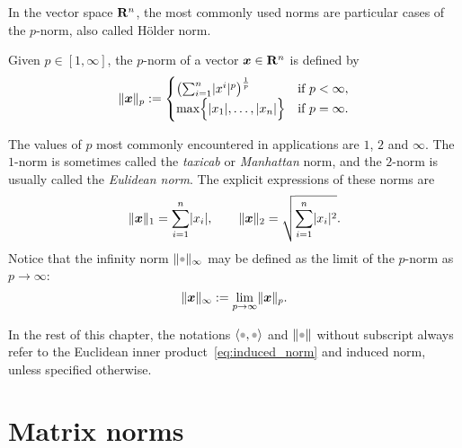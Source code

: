 In the vector space $\mathbf R^n$,
the most commonly used norms are particular cases of the $p$-norm, also called H\"older norm.
\begin{definition}
    \label{definition:pnorm_vector}
    Given $p \in [1, \infty]$,
    the $p$-norm of a vector $\mathbf{\boldsymbol{x}} \in \mathbf R^n$ is defined by
    \[
        \lVert\mathbf{\boldsymbol{x}}\rVert_p :=
        \begin{cases}
            \left( \sum_{i=1}^{n} \lvert x^i\rvert^p \right)^{\frac{1}{p}} & \text{if $p < \infty$}, \\
            \max \Bigl\{ \lvert x_1\rvert, \dotsc, \lvert x_n\rvert \Bigr\} & \text{if $p = \infty$}.
        \end{cases}
    \]
\end{definition}
The values of $p$ most commonly encountered in applications are $1$, $2$ and $\infty$.
The $1$-norm is sometimes called the \emph{taxicab} or \emph{Manhattan} norm,
and the $2$-norm is usually called the \emph{Eulidean norm}.
The explicit expressions of these norms are
\[
    \lVert\mathbf{\boldsymbol{x}}\rVert_1 = \sum_{i=1}^{n} \lvert x_i\rvert,
    \qquad
    \lVert\mathbf{\boldsymbol{x}}\rVert_2 = \sqrt{\sum_{i=1}^{n} \lvert x_i\rvert^2}.
\]
Notice that the infinity norm $\norm{\placeholder}_{\infty}$ may be defined as the limit of the $p$-norm as $p \to \infty$:
\[
    \lVert\mathbf{\boldsymbol{x}}\rVert_{\infty}
    := \lim_{p \to \infty} \lVert\mathbf{\boldsymbol{x}}\rVert_p.
\]

In the rest of this chapter,
the notations $\ip{\placeholder,\placeholder}$ and $\norm{\placeholder}$ without subscript always refer to the Euclidean inner product~\eqref{eq:induced_norm} and induced norm,
unless specified otherwise.

\section{Matrix norms}%
\label{sec:matrix_norms}

